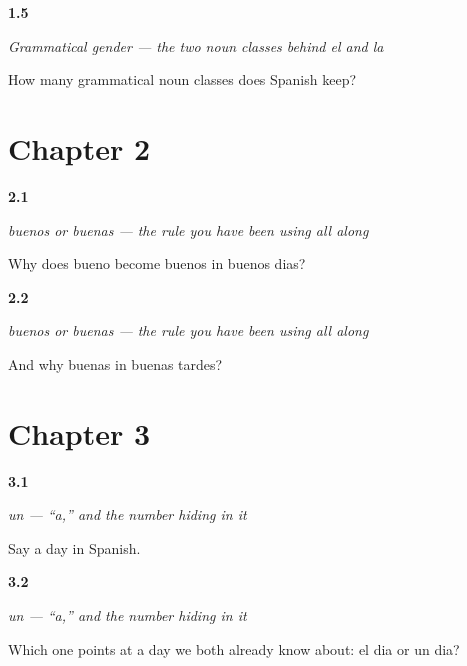 \noindent\begin{minipage}[t]{\linewidth}
\raggedright
\hypertarget{review-ES-C01-genero-gramatical-class-count}{\textbf{1.5}} \emph{Grammatical gender — the two noun classes behind \emph{el} and \emph{la}}\par
\small How many grammatical noun classes does Spanish keep?
\end{minipage}\par\medskip

\section*{Chapter 2}

\noindent\begin{minipage}[t]{\linewidth}
\raggedright
\hypertarget{review-ES-C02-concordancia-why-buenos}{\textbf{2.1}} \emph{buenos or buenas — the rule you have been using all along}\par
\small Why does bueno become buenos in buenos dias?
\end{minipage}\par\medskip

\noindent\begin{minipage}[t]{\linewidth}
\raggedright
\hypertarget{review-ES-C02-concordancia-why-buenas}{\textbf{2.2}} \emph{buenos or buenas — the rule you have been using all along}\par
\small And why buenas in buenas tardes?
\end{minipage}\par\medskip

\section*{Chapter 3}

\noindent\begin{minipage}[t]{\linewidth}
\raggedright
\hypertarget{review-ES-C02-un-form}{\textbf{3.1}} \emph{un — \textquotedblleft{}a,\textquotedblright{} and the number hiding in it}\par
\small Say a day in Spanish.
\end{minipage}\par\medskip

\noindent\begin{minipage}[t]{\linewidth}
\raggedright
\hypertarget{review-ES-C02-un-contrast}{\textbf{3.2}} \emph{un — \textquotedblleft{}a,\textquotedblright{} and the number hiding in it}\par
\small Which one points at a day we both already know about: el dia or un dia?
\end{minipage}\par\medskip

